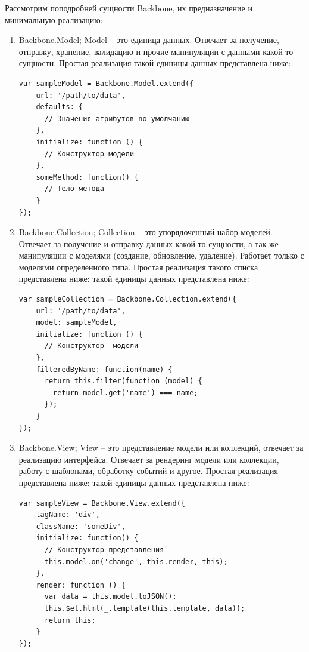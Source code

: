 Рассмотрим поподробней сущности Backbone, их предназначение и минимальную реализацию:
\begin{enumerate}
\item Backbone.Model; Model  -- это единица данных. Отвечает за получение, отправку, хранение, валидацию и прочие манипуляции с данными какой-то сущности. Простая реализация такой единицы данных представлена ниже\cite{backdoc}:
\begin{lstlisting}[basicstyle=\normalsize]
var sampleModel = Backbone.Model.extend({
    url: '/path/to/data',
    defaults: {
      // Значения атрибутoв nо-умолчанию
    },
    initialize: function () {
      // Конструктоp модели
    },
    someMethod: function() {
      // Телo метода
    }
});
\end{lstlisting}

\item Backbone.Collection; Collection -- это упорядоченный набор  моделей. Отвечает за получение и отправку данных какой-то сущности, а так же манипуляции с моделями (создание, обновление, удаление). Работает только с моделями определенного типа. Простая реализация такого списка представлена ниже:
такой единицы данных представлена ниже\cite{backdoc}:
\begin{lstlisting}[basicstyle=\normalsize]
var sampleCollection = Backbone.Collection.extend({
    url: '/path/to/data',
    model: sampleModel,
    initialize: function () {
      // Конструктоp  модели
    },
    filteredByName: function(name) {
      return this.filter(function (model) {
        return model.get('name') === name;
      });
    }
});
\end{lstlisting}

\item Backbone.View; View -- это представление модели или коллекций, отвечает за реализацию интерфейса. Отвечает за рендеринг модели или коллекции, работу с шаблонами, обработку событий и другое. Простая реализация представлена ниже:
такой единицы данных представлена ниже\cite{backdoc}:
\begin{lstlisting}[basicstyle=\normalsize]
var sampleView = Backbone.View.extend({
    tagName: 'div',
    className: 'someDiv',
    initialize: function() {
      // Конструктоp представления
      this.model.on('change', this.render, this);
    },
    render: function () {
      var data = this.model.toJSON();
      this.$el.html(_.template(this.template, data));
      return this;
    }
});
\end{lstlisting}


\end{enumerate}
